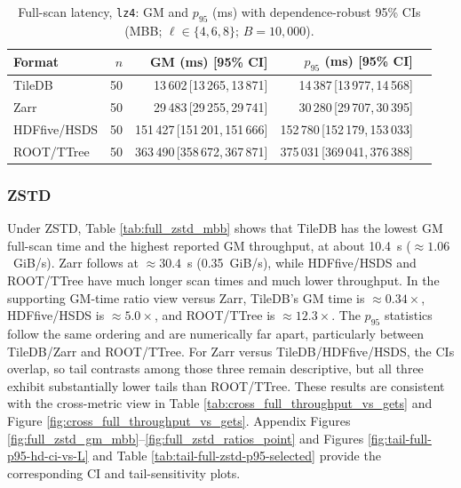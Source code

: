 \documentclass[nomenclature, english, bibtex]{kththesis}
\numberwithin{listing}{chapter}
\begin{document}
\begin{table}[H]
  \centering
  \caption{Full-scan latency, \texttt{lz4}: \gls{GM} and $p_{95}$ (ms) with dependence-robust 95\% CIs (\gls{MBB}; $\ell\in\{4,6,8\}$; $B{=}10{,}000$).}
  \label{tab:full_lz4_mbb}
  \begin{tabular}{lrrrr}
    \toprule
    Format & $n$ & \gls{GM} (ms) [95\% \gls{CI}] & $p_{95}$ (ms) [95\% \gls{CI}] \\
    \midrule
    TileDB & 50 & 13\,602\,[13\,265,\,13\,871] & 14\,387\,[13\,977,\,14\,568] \\
    Zarr   & 50 & 29\,483\,[29\,255,\,29\,741] & 30\,280\,[29\,707,\,30\,395] \\
    \gls{HDFfive}/\gls{HSDS}   & 50 & 151\,427\,[151\,201,\,151\,666] & 152\,780\,[152\,179,\,153\,033] \\
    \gls{ROOT}/\gls{TTree}   & 50 & 363\,490\,[358\,672,\,367\,871] & 375\,031\,[369\,041,\,376\,388] \\
    \bottomrule
  \end{tabular}
\end{table}



\subsubsection{\texorpdfstring{\gls{ZSTD}}{zstd}}
Under \gls{ZSTD}, Table \ref{tab:full_zstd_mbb} shows that TileDB has the lowest \gls{GM} full-scan time and the highest reported \gls{GM} throughput, at about 10.4~s ($\approx 1.06$~GiB/s). Zarr follows at $\approx 30.4$~s (0.35~GiB/s), while \gls{HDFfive}/\gls{HSDS} and \gls{ROOT}/\gls{TTree} have much longer scan times and much lower throughput. In the supporting \gls{GM}-time ratio view versus Zarr, TileDB’s \gls{GM} time is $\approx 0.34\times$, \gls{HDFfive}/\gls{HSDS} is $\approx 5.0\times$, and \gls{ROOT}/\gls{TTree} is $\approx 12.3\times$. The $p_{95}$ statistics follow the same ordering and are numerically far apart, particularly between TileDB/Zarr and \gls{ROOT}/\gls{TTree}. For Zarr versus TileDB/\gls{HDFfive}/\gls{HSDS}, the CIs overlap, so tail contrasts among those three remain descriptive, but all three exhibit substantially lower tails than \gls{ROOT}/\gls{TTree}. These results are consistent with the cross-metric view in Table \ref{tab:cross_full_throughput_vs_gets} and Figure \ref{fig:cross_full_throughput_vs_gets}. Appendix Figures \ref{fig:full_zstd_gm_mbb}–\ref{fig:full_zstd_ratios_point} and Figures \ref{fig:tail-full-p95-hd-ci-vs-L} and Table \ref{tab:tail-full-zstd-p95-selected} provide the corresponding \gls{CI} and tail-sensitivity plots.
\end{document}

